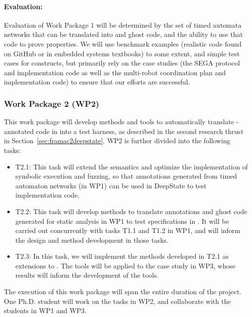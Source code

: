 \paragraph{Evaluation:} Evaluation of
Work Package 1 will be determined by the set of timed automata
networks that can be translated into \acsl and ghost code, and the
ability to use that code to prove properties.  We will use benchmark
examples (realistic code found on GitHub or in embedded systems
textbooks) to some extent, and simple test cases for constructs, but
primarily rely on the case studies (the SEGA protocol and implementation code as well as the multi-robot coordination plan and implementation code) to ensure
that our efforts are successful.


\subsubsection{Work Package 2 (WP2)}

This work package will develop methods and tools to automatically translate \acsl-annotated code in \framac into a \deepstate test harness, as described in the second research thrust in Section~\ref{sec:framac2deepstate}.
WP2 is further divided into the following tasks:
\begin{itemize}[labelsep=3pt,leftmargin=12pt]
\item T2.1: This task will extend the \eacsl semantics and optimize the implementation of symbolic execution and fuzzing, so that \acsl annotations generated from timed automaton networks (in WP1) can be used in DeepState to test implementation code.
\item T2.2: This task will develop methods to translate annotations and ghost code generated for static analysis in WP1 to test specifications in \deepstate.  It will be carried out concurrently with tasks T1.1 and T1.2 in WP1, and will inform the design and method development in those tasks.
\item T2.3: In this task, we will implement the methods developed in T2.1 as extensions to \deepstate.  The tools will be applied to the case study in WP3, whose results will inform the development of the tools.
\end{itemize}

The execution of this work package will span the entire duration of the project.
One Ph.D. student will work on the tasks in WP2, and collaborate with
the students in WP1 and WP3.

